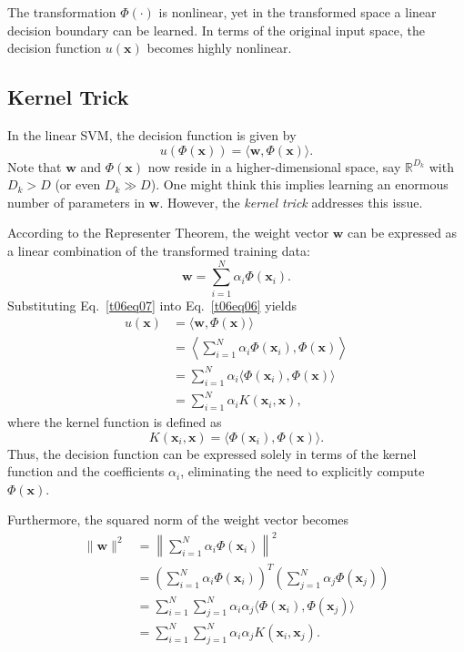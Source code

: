 \documentclass[12pt]{article}
\begin{document}
The transformation $\Phi(\cdot)$ is nonlinear, yet in the transformed space a linear decision boundary can be learned. In terms of the original input space, the decision function $u(\bm{x})$ becomes highly nonlinear.

\subsection{Kernel Trick}
In the linear SVM, the decision function is given by
\begin{equation}
u(\Phi(\bm{x})) = \langle \bm{w}, \Phi(\bm{x}) \rangle.
\label{t06eq06}
\end{equation}
Note that $\bm{w}$ and $\Phi(\bm{x})$ now reside in a higher-dimensional space, say $\mathbb{R}^{D_k}$ with $D_k > D$ (or even $D_k \gg D$). One might think this implies learning an enormous number of parameters in $\bm{w}$. However, the \textit{kernel trick} addresses this issue.

According to the Representer Theorem, the weight vector $\bm{w}$ can be expressed as a linear combination of the transformed training data:
\begin{equation}
\bm{w} = \sum_{i=1}^N \alpha_i \Phi(\bm{x}_i).
\label{t06eq07}
\end{equation}
Substituting Eq.~\ref{t06eq07} into Eq.~\ref{t06eq06} yields
\begin{equation}
\begin{split}
u(\bm{x}) &= \langle \bm{w}, \Phi(\bm{x}) \rangle \\
           &= \left\langle \sum_{i=1}^N \alpha_i \Phi(\bm{x}_i), \Phi(\bm{x}) \right\rangle \\
           &= \sum_{i=1}^N \alpha_i \langle \Phi(\bm{x}_i), \Phi(\bm{x}) \rangle \\
           &= \sum_{i=1}^N \alpha_i K(\bm{x}_i, \bm{x}),
\end{split}
\label{t06eq08}
\end{equation}
where the kernel function is defined as
\[
K(\bm{x}_i, \bm{x}) = \langle \Phi(\bm{x}_i), \Phi(\bm{x}) \rangle.
\]
Thus, the decision function can be expressed solely in terms of the kernel function and the coefficients $\alpha_i$, eliminating the need to explicitly compute $\Phi(\bm{x})$.

Furthermore, the squared norm of the weight vector becomes
\begin{equation}
\begin{split}
\|\bm{w}\|^2 &= \left\|\sum_{i=1}^N \alpha_i \Phi(\bm{x}_i)\right\|^2 \\
              &= \left( \sum_{i=1}^N \alpha_i \Phi(\bm{x}_i) \right)^T \left( \sum_{j=1}^N \alpha_j \Phi(\bm{x}_j) \right) \\
              &= \sum_{i=1}^N \sum_{j=1}^N \alpha_i \alpha_j \langle \Phi(\bm{x}_i), \Phi(\bm{x}_j) \rangle \\
              &= \sum_{i=1}^N \sum_{j=1}^N \alpha_i \alpha_j K(\bm{x}_i, \bm{x}_j).
\end{split}
\label{t06eq09}
\end{equation}
\end{document}
